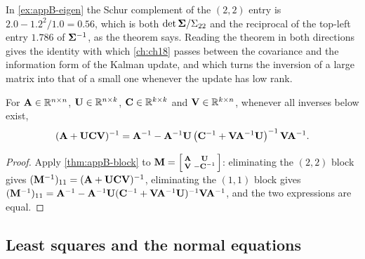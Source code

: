 In \cref{ex:appB-eigen} the Schur complement of the $(2,2)$ entry is $2.0 -
1.2^2/1.0 = 0.56$, which is both $\det\mathbf{\Sigma}/\Sigma_{22}$ and the
reciprocal of the top-left entry $1.786$ of $\mathbf{\Sigma}^{-1}$, as the theorem
says. Reading the theorem in both directions gives the identity with which
\cref{ch:ch18} passes between the covariance and the information form of the
Kalman update, and which turns the inversion of a large matrix into that of a
small one whenever the update has low rank.

\begin{proposition}
\label{thm:appB-woodbury}
For $\mathbf{A} \in \mathbb{R}^{n\times n}$, $\mathbf{U} \in \mathbb{R}^{n \times k}$, $\mathbf{C} \in \mathbb{R}^{k \times k}$ and $\mathbf{V} \in \mathbb{R}^{k \times n}$, whenever all inverses below exist,
\begin{equation}
  (\mathbf{A} + \mathbf{U}\mathbf{C}\mathbf{V})^{-1} = \mathbf{A}^{-1} - \mathbf{A}^{-1}\mathbf{U}\left(\mathbf{C}^{-1} + \mathbf{V}\mathbf{A}^{-1}\mathbf{U}\right)^{-1}\mathbf{V}\mathbf{A}^{-1} .
  \label{eq:appB-woodbury}
\end{equation}
\end{proposition}
\begin{proof}
Apply \cref{thm:appB-block} to $\mathbf{M} = \begin{bsmallmatrix}\mathbf{A} & \mathbf{U}\\ \mathbf{V} & -\mathbf{C}^{-1}\end{bsmallmatrix}$: eliminating the $(2,2)$ block gives $(\mathbf{M}^{-1})_{11} = (\mathbf{A} + \mathbf{U}\mathbf{C}\mathbf{V})^{-1}$, eliminating the $(1,1)$ block gives $(\mathbf{M}^{-1})_{11} = \mathbf{A}^{-1} - \mathbf{A}^{-1}\mathbf{U}(\mathbf{C}^{-1} + \mathbf{V}\mathbf{A}^{-1}\mathbf{U})^{-1}\mathbf{V}\mathbf{A}^{-1}$, and the two expressions are equal. \qedhere
\end{proof}

\subsection{Least squares and the normal equations}
\label{sec:appB-lsq}

